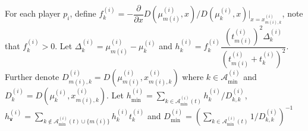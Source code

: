 \documentclass{article}
\begin{document}
\label{app:fluid-one-sided}
For each player $p_i$, define $f^{(i)}_k = -\dfrac{\partial}{\partial x} D\left(\mu^{(i)}_{m(i)},x\right)/D\left(\mu^{(i)}_{k},x\right)\Big|_{x=x^{(i)}_{m(i),k}}$, note that $f^{(i)}_k>0$.  Let $\Delta^{(i)}_{k}=\mu^{(i)}_{m(i)}-\mu^{(i)}_{k}$ and $h^{(i)}_{k} = f^{(i)}_k \dfrac{(t^{(i)}_{m(i)})^2\Delta^{(i)}_{k}}{(t^{(i)}_{m(i)}+t^{(i)}_k)^2}$. Further denote $D^{(i)}_{m(i),k}=D\left(\mu^{(i)}_{m(i)},x^{(i)}_{m(i),k}\right)$ where $k\in \mathcal{A}^{(i)}_{\min}$ and $D^{(i)}_{k}=D\left(\mu^{(i)}_{k},x^{(i)}_{m(i),k}\right)$. Let $h^{(i)}_{\min}= \sum_{k\in\mathcal{A}^{(i)}_{\min}(t)}h^{(i)}_{k}/D^{(i)}_{k,k}$, $h^{(i)}_{\texttt{w}} = \sum_{k\not\in\mathcal{A}^{(i)}_{\min}(t)\cup\{m(i)\}}h^{(i)}_{k}t^{(i)}_k$ and $D^{(i)}_{\min} = (\sum_{k\in\mathcal{A}^{(i)}_{\min}(t)}1/D^{(i)}_{k,k})^{-1}$
\end{document}
